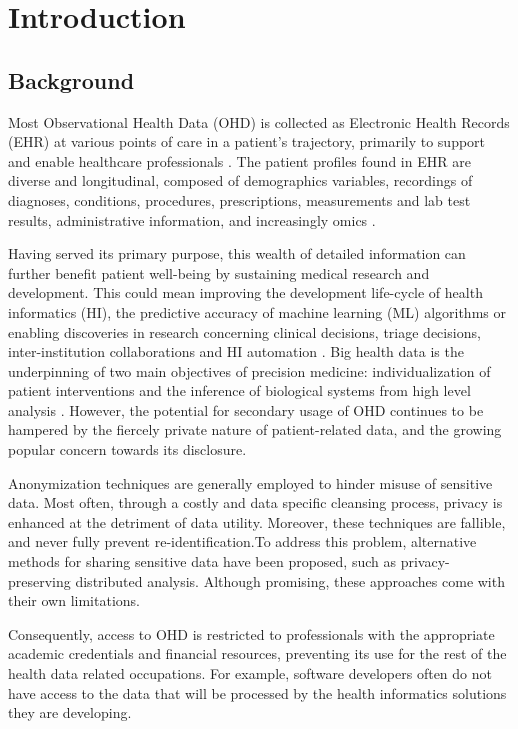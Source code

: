\section{Introduction}
\subsection{Background}
Most Observational Health Data (OHD) is collected as Electronic Health Records (EHR) at various points of care in a patient’s trajectory, primarily to support and enable healthcare professionals \cite{Cowie_2016}. The patient profiles found in EHR are diverse and longitudinal, composed of demographics variables, recordings of diagnoses, conditions, procedures, prescriptions, measurements and lab test results, administrative information, and increasingly omics \cite{Ohdsi2020-vf}.\par
Having served its primary purpose, this wealth of detailed information can further benefit patient well-being by sustaining medical research and development. This could mean improving the development life-cycle of health informatics (HI), the predictive accuracy of machine learning (ML) algorithms or enabling discoveries in research concerning clinical decisions, triage decisions, inter-institution collaborations and HI automation \cite{Rudin_2020}. Big health data is the underpinning of two main objectives of precision medicine: individualization of patient interventions and the inference of biological systems from high level analysis \cite{Capobianco2020}. However, the potential for secondary usage of OHD continues to be hampered by the fiercely private nature of patient-related data, and the growing popular concern towards its disclosure.\par
Anonymization techniques are generally employed to hinder misuse of sensitive data. Most often, through a costly and data specific cleansing process, privacy is enhanced at the detriment of data utility. Moreover, these techniques are fallible, and never fully prevent re-identification.To address this problem, alternative methods for sharing sensitive data have been proposed, such as privacy-preserving distributed analysis. Although promising, these approaches come with their own limitations.\par
Consequently, access to OHD is restricted to professionals with the appropriate academic credentials and financial resources, preventing its use for the rest of the health data related occupations. For example, software developers often do not have access to the data that will be processed by the health informatics solutions they are developing.
